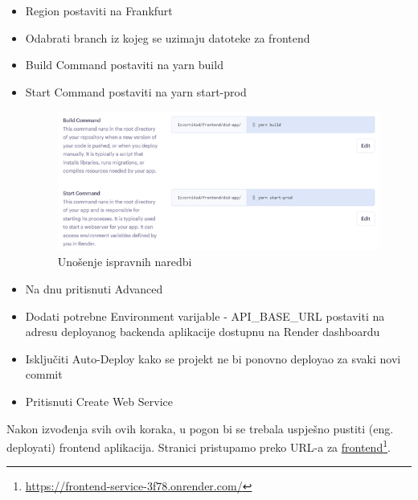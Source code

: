 \begin{itemize}
\begin{figure}[H]
    			\label{fig:fillDataFront}
    			\end{figure}
                    \item Region postaviti na Frankfurt
                    \item Odabrati branch iz kojeg se uzimaju datoteke za frontend
                    \item Build Command postaviti na yarn build
                    \item Start Command postaviti na yarn start-prod
                    \begin{figure}[H]
    			\includegraphics[]{slike/buildFront.png}
    			\centering
    			\caption{Unošenje ispravnih naredbi}
    			\label{fig:buildFrontCommands}
    			\end{figure}\textbf{}
                    \item Na dnu pritisnuti Advanced
                    \item Dodati potrebne Environment varijable - API\_BASE\_URL postaviti na adresu deployanog backenda aplikacije dostupnu na Render dashboardu
                    \item Isključiti Auto-Deploy kako se projekt ne bi ponovno deployao za svaki novi commit
                    \item Pritisnuti Create Web Service
                \end{itemize}

                Nakon izvođenja svih ovih koraka, u pogon bi se trebala uspješno pustiti (eng. deployati) frontend aplikacija. Stranici pristupamo preko URL-a za \underline{frontend}\footnote{\url{https://frontend-service-3f78.onrender.com/}}.
